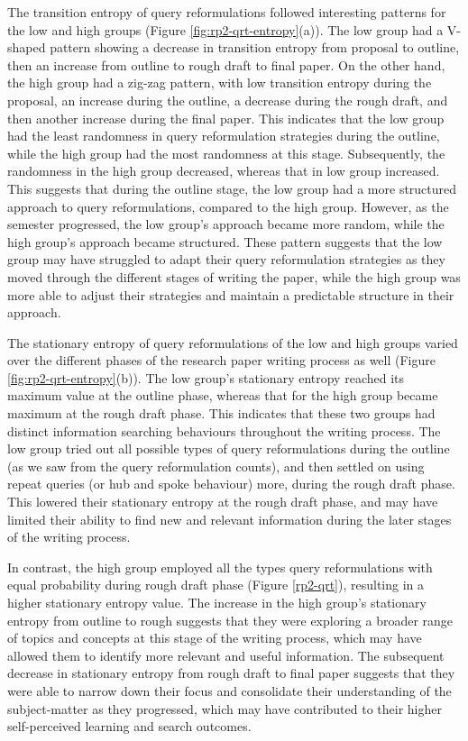 \documentclass[letterpaper, nobind]{templates/ociamthesis}
\begin{document}
The transition entropy of query reformulations followed interesting patterns for the low and high groups (Figure \ref{fig:rp2-qrt-entropy}(a)).
The low group had a V-shaped pattern showing a decrease in transition entropy from proposal to outline, then an increase from outline to rough draft to final paper.
On the other hand, the high group had a zig-zag pattern, with low transition entropy during the proposal, an increase during the outline, a decrease during the rough draft, and then another increase during the final paper.
This indicates that the low group had the least randomness in query reformulation strategies during the outline, while the high group had the most randomness at this stage.
Subsequently, the randomness in the high group decreased, whereas that in low group increased.
This suggests that during the outline stage, the low group had a more structured approach to query reformulations, compared to the high group.
However, as the semester progressed, the low group's approach became more random, while the high group's approach became structured.
These pattern suggests that the low group may have struggled to adapt their query reformulation strategies as they moved through the different stages of writing the paper, while the high group was more able to adjust their strategies and maintain a predictable structure in their approach.

The stationary entropy of query reformulations of the low and high groups varied over the different phases of the research paper writing process as well (Figure \ref{fig:rp2-qrt-entropy}(b)).
The low group's stationary entropy reached its maximum value at the outline phase, whereas that for the high group became maximum at the rough draft phase.
This indicates that these two groups had distinct information searching behaviours throughout the writing process.
The low group tried out all possible types of query reformulations during the outline (as we saw from the query reformulation counts), and then settled on using repeat queries (or hub and spoke behaviour) more, during the rough draft phase.
This lowered their stationary entropy at the rough draft phase, and may have limited their ability to find new and relevant information during the later stages of the writing process.

In contrast, the high group employed all the types query reformulations with equal probability during rough draft phase (Figure \ref{rp2-qrt}), resulting in a higher stationary entropy value.
The increase in the high group's stationary entropy from outline to rough suggests that they were exploring a broader range of topics and concepts at this stage of the writing process, which may have allowed them to identify more relevant and useful information.
The subsequent decrease in stationary entropy from rough draft to final paper suggests that they were able to narrow down their focus and consolidate their understanding of the subject-matter as they progressed, which may have contributed to their higher self-perceived learning and search outcomes.
\end{document}
